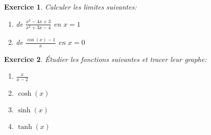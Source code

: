 \documentclass[12pt]{article}
\newtheorem{exercice}{\bf Exercice}
\newtheorem{correction}{\bf Correction exercice}
\newenvironment{exo}{
\begin{exercice}\smallskip\normalfont}{\end{exercice}
}
\newenvironment{cor}{
\begin{correction}\smallskip\normalfont}{\end{correction}
}
\newif\ifcorrige\corrigefalse
\begin{document}
\begin{exo} Calculer les limites suivantes:
\begin{multicols}{2}
\begin{enumerate}
\item de $\frac{x^2-4x+3}{x^2+3x-4}$ en $x=1$
\item de $\frac{\cos(x) - 1}{x}$ en $x=0$
\end{enumerate}
\end{multicols}
\end{exo}

\ifcorrige
\color{magenta}
\begin{cor}
$\qquad$
\begin{enumerate}
\item Si la fonction \'etait d\'efinie en $1$, il suffirait de l'\'evaluer pour obteir sa limite.
  Ici cette fonction est une fraction, le num\'erateur et le d\'enominateur tendent tous les deux vers z\'ero
  quand $x \to 1$ (et ce sont des polyn\^omes).
  On peut donc mettre $x-1$ en facteur et simplifier.
  On a $x^2-4x+3 = (x-1)(x-3)$ et $x^2+3x-4 = (x-1)(x+4)$.
  Ainsi, $\frac{x^2-4x+3}{x^2+3x-4} = \frac{x-3}{x+4}$
  et donc $\lim_{x \to 1} \frac{x^2-4x+3}{x^2+3x-4} = \lim_{x \to 1} \frac{x-3}{x+4} = - \frac25$.

\item Pour cette question, nous allons faire un d\'eveloppement limit\'e du cosinus en $0$:
  $\cos(x) = 1 - \frac{x^2}{2} + O(x^4)$ et donc
  $\frac{\cos(x) - 1}{x} = - \frac{x}{2} + O(x^3)$
  et donc $\lim_{x \to 0} \frac{\cos(x)-1}{x} = 0$.
\end{enumerate}
\end{cor}
\color{black}
\fi



\begin{exo} \'Etudier les fonctions suivantes et tracer leur graphe:
\begin{multicols}{4}
\begin{enumerate}
\item $\frac{x}{x-2}$
\item $\cosh(x)$
\item $\sinh(x)$
\item $\tanh(x)$
\end{enumerate}
\end{multicols}
\end{exo}
\end{document}
